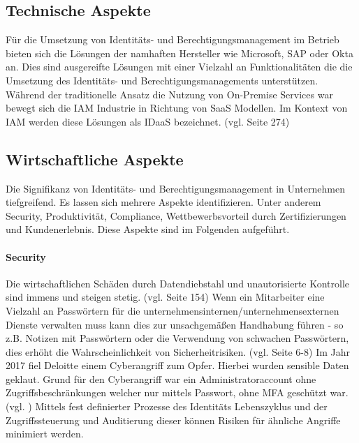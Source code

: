 \documentclass[11pt]{article}
\begin{document}
\subsection{Technische Aspekte}
Für die Umsetzung von Identitäts- und Berechtigungsmanagement im Betrieb bieten sich die Lösungen der namhaften Hersteller wie Microsoft, SAP oder Okta an. Dies sind ausgereifte Lösungen mit einer Vielzahl an Funktionalitäten die die Umsetzung des Identitäts- und Berechtigungsmanagements unterstützen. Während der traditionelle Ansatz die Nutzung von On-Premise Services war bewegt sich die IAM Industrie in Richtung von SaaS Modellen. Im Kontext von IAM werden diese Lösungen als IDaaS bezeichnet. (vgl. \cite{kunz2014analyzing} Seite 274)
\subsection{Wirtschaftliche Aspekte}
Die Signifikanz von Identitäts- und Berechtigungsmanagement in Unternehmen tiefgreifend. Es lassen sich mehrere Aspekte identifizieren. Unter anderem Security, Produktivität, Compliance, Wettbewerbsvorteil durch Zertifizierungen und Kundenerlebnis. Diese Aspekte sind im Folgenden aufgeführt.
\paragraph{Security}
Die wirtschaftlichen Schäden durch Datendiebstahl und unautorisierte Kontrolle sind immens und steigen stetig. (vgl. \cite{furnell2020understanding} Seite 154) Wenn ein Mitarbeiter eine Vielzahl an Passwörtern für die unternehmensinternen/unternehmensexternen Dienste verwalten muss kann dies zur unsachgemäßen Handhabung führen - so z.B. Notizen mit Passwörtern oder die Verwendung von schwachen Passwörtern, dies erhöht die Wahrscheinlichkeit von Sicherheitrisiken. (vgl. \cite{haag2012selecting} Seite 6-8) Im Jahr 2017 fiel Deloitte einem Cyberangriff zum Opfer. Hierbei wurden sensible Daten geklaut. Grund für den Cyberangriff war ein Administratoraccount ohne Zugriffsbeschränkungen welcher nur mittels Passwort, ohne MFA geschützt war. (vgl. \cite{deloitte2017}) Mittels fest definierter Prozesse des Identitäts Lebenszyklus und der Zugriffssteuerung und Auditierung dieser können Risiken für ähnliche Angriffe minimiert werden.
\end{document}
